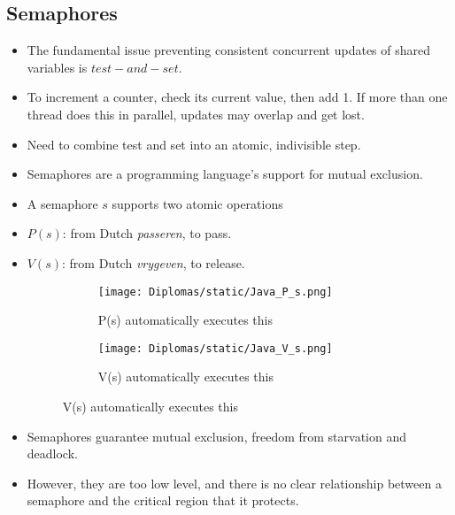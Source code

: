 \documentclass[a4paper]{article}
\begin{document}
\subsection{Semaphores}
\begin{itemize}
    \item The fundamental issue preventing consistent concurrent updates of shared variables is $test-and-set$.
    \item To increment a counter, check its current value, then add 1. If more than one thread does this in parallel, updates may overlap and get lost.
    \item Need to combine test and set into an atomic, indivisible step.
    \item Semaphores are a programming language's support for mutual exclusion.
    \item A semaphore $s$ supports two atomic operations
    \item $P(s)$: from Dutch \textit{passeren}, to pass.
    \item $V(s)$: from Dutch \textit{vrygeven}, to release.
    \begin{figure}[H]
        \centering
        \begin{subfigure}[b]{0.45\textwidth}
            \centering
            \texttt{[image: Diplomas/static/Java\_P\_s.png]}
            \caption{P(s) automatically executes this}
            \label{fig:Java-P-s}
        \end{subfigure}
        \hfill
        \begin{subfigure}[b]{0.45\textwidth}
            \centering
            \texttt{[image: Diplomas/static/Java\_V\_s.png]}
            \caption{V(s) automatically executes this}
            \label{fig:Java-V-s}
        \end{subfigure}
    \end{figure}
    \item Semaphores guarantee mutual exclusion, freedom from starvation and deadlock.
    \item However, they are too low level, and there is no clear relationship between a semaphore and the critical region that it protects.
\end{itemize}
\end{document}
